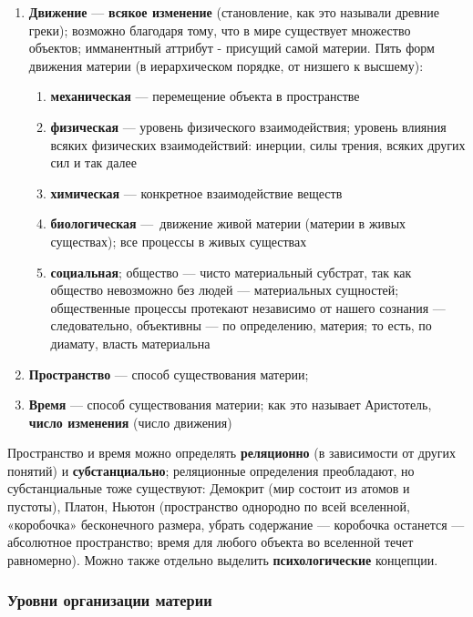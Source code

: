 \documentclass{article}
\begin{document}
\begin{flushleft}
\begin{enumerate}
    \item \textbf{Движение} — \textbf{всякое изменение} (становление, как это называли древние греки); возможно благодаря тому, что в мире существует множество объектов; имманентный аттрибут - присущий самой материи. Пять форм движения материи (в иерархическом порядке, от низшего к высшему):
    \begin{enumerate}
        \item \textbf{механическая} — перемещение объекта в пространстве
        \item \textbf{физическая} — уровень физического взаимодействия; уровень влияния всяких физических взаимодействий: инерции, силы трения, всяких других сил и так далее
        \item \textbf{химическая} — конкретное взаимодействие веществ
        \item \textbf{биологическая} — движение живой материи (материи в живых существах); все процессы в живых существах
        \item \textbf{социальная}; общество — чисто материальный субстрат, так как общество невозможно без людей — материальных сущностей; общественные процессы протекают независимо от нашего сознания — следовательно, объективны — по определению, материя; то есть, по диамату, власть материальна
    \end{enumerate}
    \item \textbf{Пространство} — способ существования материи;
    \item \textbf{Время} — способ существования материи; как это называет Аристотель, \textbf{число изменения} (число движения)
\end{enumerate}

Пространство и время можно определять \textbf{реляционно} (в зависимости от других понятий) и \textbf{субстанциально}; реляционные определения преобладают, но субстанциальные тоже существуют: Демокрит (мир состоит из атомов и пустоты), Платон, Ньютон (пространство однородно по всей вселенной, «коробочка» бесконечного размера, убрать содержание — коробочка останется — абсолютное пространство; время для любого объекта во вселенной течет равномерно). Можно также отдельно выделить \textbf{психологические} концепции.

\subsubsection{Уровни организации материи}


\end{flushleft}
\end{document}
